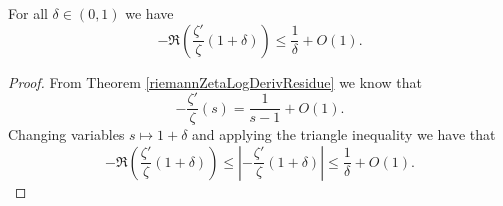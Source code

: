 \begin{theorem}[ShiftZeroBound]
\label{ShiftZeroBound}
\leanok
For all $\delta\in(0,1)$ we have
    $$-\Re \left(\frac{\zeta'}{\zeta}(1+\delta)\right)\leq\frac{1}{\delta}+O(1).$$
\end{theorem}
\begin{proof}
\leanok
From Theorem \ref{riemannZetaLogDerivResidue} we know that
    $$-\frac{\zeta'}{\zeta}(s)=\frac{1}{s-1}+O(1).$$
    Changing variables $s\mapsto 1+\delta$ and applying the triangle inequality we have that
    $$-\Re \left(\frac{\zeta'}{\zeta}(1+\delta)\right)\leq\left|
      -\frac{\zeta'}{\zeta}(1+\delta)\right|\leq\frac{1}{\delta}+O(1).$$
\end{proof}
